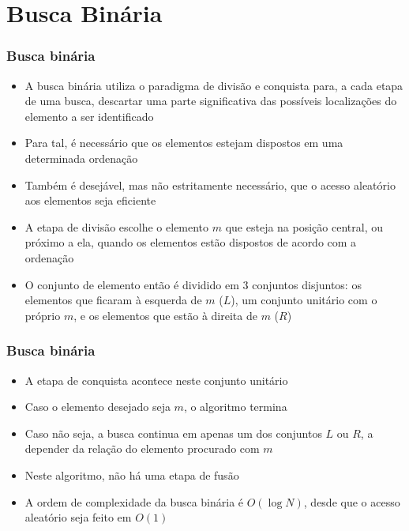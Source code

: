 \section{Busca Binária}

\begin{frame}[fragile]\frametitle{Busca binária}

    \begin{itemize}
        \item A busca binária utiliza o paradigma de divisão e conquista para, a cada etapa de
            uma busca, descartar uma parte significativa das possíveis localizações do elemento a
            ser identificado

        \item Para tal, é necessário que os elementos estejam dispostos em uma determinada 
            ordenação

        \item Também é desejável, mas não estritamente necessário, que o acesso aleatório aos
            elementos seja eficiente

        \item A etapa de divisão escolhe o elemento $m$ que esteja na posição central, ou próximo a
            ela, quando os elementos estão dispostos de acordo com a ordenação

        \item O conjunto de elemento então é dividido em 3 conjuntos disjuntos: os elementos que
            ficaram à esquerda de $m$ ($L$), um conjunto unitário com o próprio $m$, e os elementos
            que estão à direita de $m$ ($R$)
    \end{itemize}

\end{frame}

\begin{frame}[fragile]\frametitle{Busca binária}

    \begin{itemize}
        \item A etapa de conquista acontece neste conjunto unitário

        \item Caso o elemento desejado seja $m$, o algoritmo termina

        \item Caso não seja, a busca continua em apenas um dos conjuntos $L$ ou $R$, a depender
            da relação do elemento procurado com $m$

        \item Neste algoritmo, não há uma etapa de fusão

		\item A ordem de complexidade da busca binária é $O(\log N)$, desde que o acesso aleatório
            seja feito em $O(1)$
    \end{itemize}

\end{frame}

